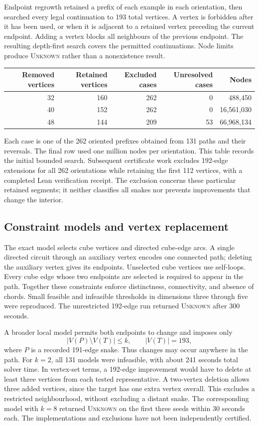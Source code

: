 \documentclass[11pt,a4paper]{article}
\theoremstyle{definition}
\theoremstyle{remark}
\begin{document}
Endpoint regrowth retained a prefix of each example in each orientation, then searched every legal continuation to 193 total vertices. A vertex is forbidden after it has been used, or when it is adjacent to a retained vertex preceding the current endpoint. Adding a vertex blocks all neighbours of the previous endpoint. The resulting depth-first search covers the permitted continuations. Node limits produce \textsc{Unknown} rather than a nonexistence result.
\begin{center}\begin{tabular}{rrrrr}
\toprule
Removed vertices & Retained vertices & Excluded cases & Unresolved cases & Nodes\\\midrule
32&160&262&0&488,450\\
40&152&262&0&16,561,030\\
48&144&209&53&66,968,134\\\bottomrule
\end{tabular}\end{center}
Each case is one of the 262 oriented prefixes obtained from 131 paths and their reversals. The final row used one million nodes per orientation. This table records the initial bounded search. Subsequent certificate work excludes 192-edge extensions for all 262 orientations while retaining the first 112 vertices, with a completed Lean verification receipt. The exclusion concerns these particular retained segments; it neither classifies all snakes nor prevents improvements that change the interior.

\subsection{Constraint models and vertex replacement}
The exact model selects cube vertices and directed cube-edge arcs. A single directed circuit through an auxiliary vertex encodes one connected path; deleting the auxiliary vertex gives its endpoints. Unselected cube vertices use self-loops. Every cube edge whose two endpoints are selected is required to appear in the path. Together these constraints enforce distinctness, connectivity, and absence of chords. Small feasible and infeasible thresholds in dimensions three through five were reproduced. The unrestricted 192-edge run returned \textsc{Unknown} after 300 seconds.

A broader local model permits both endpoints to change and imposes only
\[
|V(P)\setminus V(T)|\le k,\qquad |V(T)|=193,
\]
where $P$ is a recorded 191-edge snake. Thus changes may occur anywhere in the path. For $k=2$, all 131 models were infeasible, with about 241 seconds total solver time. In vertex-set terms, a 192-edge improvement would have to delete at least three vertices from each tested representative. A two-vertex deletion allows three added vertices, since the target has one extra vertex overall. This excludes a restricted neighbourhood, without excluding a distant snake. The corresponding model with $k=8$ returned \textsc{Unknown} on the first three seeds within 30 seconds each. The implementations and exclusions have not been independently certified.
\end{document}
